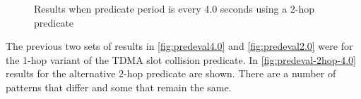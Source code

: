 \begin{figure}[H]
\centering
{}

\caption{Results when predicate period is every 4.0 seconds using a 2-hop predicate}
\label{fig:predeval-2hop-4.0}
\end{figure}

The previous two sets of results in \autoref{fig:predeval4.0} and \autoref{fig:predeval2.0} were for the 1-hop variant of the TDMA slot collision predicate. In \autoref{fig:predeval-2hop-4.0} results for the alternative 2-hop predicate are shown. There are a number of patterns that differ and some that remain the same.

